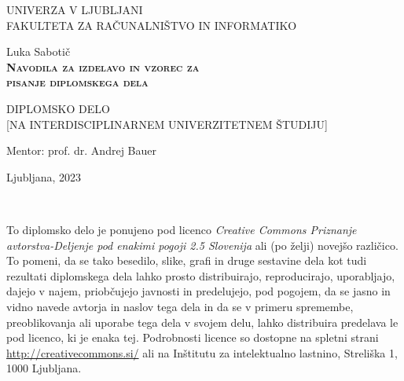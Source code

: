 \documentclass[12pt,a4paper,openany]{book}
\begin{document}
\thispagestyle{empty} 

\begin{center}
{\large 
UNIVERZA V LJUBLJANI\\
FAKULTETA ZA RAČUNALNIŠTVO IN INFORMATIKO\\
}

\vspace{3cm}
{\LARGE Luka Sabotič}\\

\vspace{2cm}
\textsc{\textbf{\LARGE 
Navodila za izdelavo in vzorec za\\ 
pisanje diplomskega dela\\ 
}}

\vspace{2cm}
{ DIPLOMSKO DELO}\\
{ [NA INTERDISCIPLINARNEM UNIVERZITETNEM ŠTUDIJU]\\
}

\vspace{2cm} 
{\Large Mentor: prof. dr. Andrej Bauer}

\vfill
{\Large Ljubljana, 2023}
\end{center}

\newpage

\ \thispagestyle{empty}

\newpage


\thispagestyle{empty}

\vspace*{5cm}
{\small \noindent
To diplomsko delo je ponujeno pod licenco \textit{Creative Commons Priznanje avtorstva-Deljenje pod enakimi pogoji 2.5 Slovenija}
ali (po želji) novejšo različico.
To pomeni, da se tako besedilo, slike, grafi in druge sestavine dela kot tudi rezultati diplomskega dela lahko prosto distribuirajo,
reproducirajo, uporabljajo, dajejo v najem, priobčujejo javnosti in predelujejo, pod pogojem, da se jasno in vidno navede avtorja in naslov tega
dela in da se v primeru spremembe, preoblikovanja ali uporabe tega dela v svojem delu, lahko distribuira predelava le pod
licenco, ki je enaka tej.
Podrobnosti licence so dostopne na spletni strani \url{http://creativecommons.si/} ali na Inštitutu za
intelektualno lastnino, Streliška 1, 1000 Ljubljana.

\begin{center}%
  \hspace*{1ex}
\end{center}
}
\end{document}
